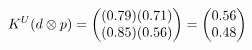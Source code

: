 \documentclass[preview]{standalone}
\begin{document}
\begin{align*}
\special{dvisvgm:raw <g id='unique000'>}K^U(d \otimes p) = \begin{pmatrix} (0.79)(0.71) \\ (0.85)(0.56) \end{pmatrix} = \begin{pmatrix} 0.56 \\ 0.48 \end{pmatrix}\special{dvisvgm:raw </g>}
\end{align*}
\end{document}
